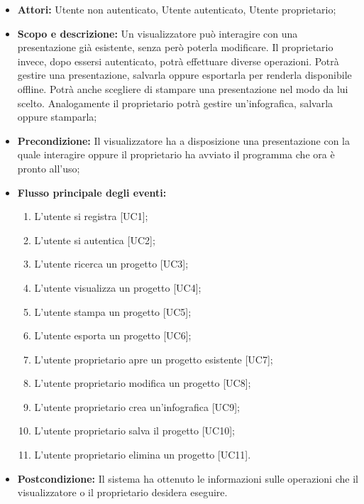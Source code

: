 \newpage

\begin{itemize}
	\item \textbf{Attori:} Utente non autenticato, Utente autenticato, Utente proprietario;
	
	\item \textbf{Scopo e descrizione:} Un visualizzatore può interagire con una presentazione già esistente, senza però poterla modificare. Il proprietario invece, dopo essersi autenticato, potrà effettuare diverse operazioni. Potrà gestire una presentazione, salvarla oppure esportarla per renderla disponibile offline. Potrà anche scegliere di stampare una presentazione nel modo da lui scelto. Analogamente il proprietario potrà gestire un'infografica, salvarla oppure stamparla;
	
	\item \textbf{Precondizione:} Il visualizzatore ha a disposizione una presentazione con la quale interagire oppure il proprietario ha avviato il programma che ora è pronto all'uso;
	
	\item \textbf{Flusso principale degli eventi:}
	\begin{enumerate}
		\item L'utente si registra [UC1];
		\item L'utente si autentica [UC2];
		\item L'utente ricerca un progetto [UC3];
		\item L'utente visualizza un progetto [UC4];
		\item L'utente stampa un progetto [UC5];
		\item L'utente esporta un progetto [UC6];
		\item L'utente proprietario apre un progetto esistente [UC7];
		\item L'utente proprietario modifica un progetto [UC8];
		\item L'utente proprietario crea un'infografica [UC9];		
		\item L'utente proprietario salva il progetto [UC10];
		\item L'utente proprietario elimina un progetto [UC11].
	\end{enumerate}
	
	\item \textbf{Postcondizione:} Il sistema ha ottenuto le informazioni sulle operazioni che il visualizzatore o il proprietario desidera eseguire.
\end{itemize}

